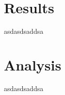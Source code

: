 \documentclass[conference]{IEEEtran}
\begin{document}
\section{Results}
asdasdsaddsa

\section{Analysis}
asdasdsaddsa



%
%



%
%
\end{document}
